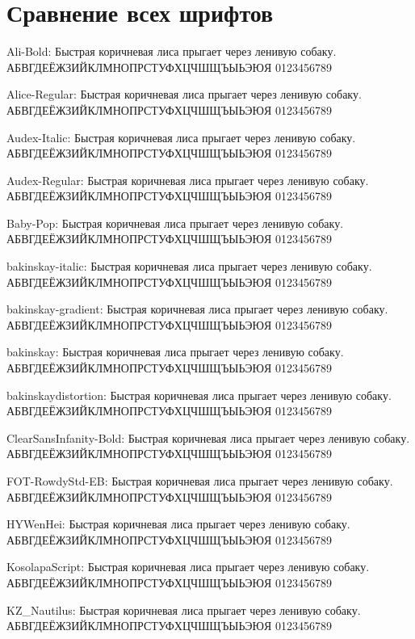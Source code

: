 \documentclass[12pt]{article}
\begin{document}
\section{Сравнение всех шрифтов}

{\alibold Ali-Bold: Быстрая коричневая лиса прыгает через ленивую собаку. АБВГДЕЁЖЗИЙКЛМНОПРСТУФХЦЧШЩЪЫЬЭЮЯ 0123456789}

{\aliceregular Alice-Regular: Быстрая коричневая лиса прыгает через ленивую собаку. АБВГДЕЁЖЗИЙКЛМНОПРСТУФХЦЧШЩЪЫЬЭЮЯ 0123456789}

{\audexitalic Audex-Italic: Быстрая коричневая лиса прыгает через ленивую собаку. АБВГДЕЁЖЗИЙКЛМНОПРСТУФХЦЧШЩЪЫЬЭЮЯ 0123456789}

{\audexregular Audex-Regular: Быстрая коричневая лиса прыгает через ленивую собаку. АБВГДЕЁЖЗИЙКЛМНОПРСТУФХЦЧШЩЪЫЬЭЮЯ 0123456789}

{\babypop Baby-Pop: Быстрая коричневая лиса прыгает через ленивую собаку. АБВГДЕЁЖЗИЙКЛМНОПРСТУФХЦЧШЩЪЫЬЭЮЯ 0123456789}

{\bakinskayitalic bakinskay-italic: Быстрая коричневая лиса прыгает через ленивую собаку. АБВГДЕЁЖЗИЙКЛМНОПРСТУФХЦЧШЩЪЫЬЭЮЯ 0123456789}

{\bakinskaygradient bakinskay-gradient: Быстрая коричневая лиса прыгает через ленивую собаку. АБВГДЕЁЖЗИЙКЛМНОПРСТУФХЦЧШЩЪЫЬЭЮЯ 0123456789}

{\bakinskay bakinskay: Быстрая коричневая лиса прыгает через ленивую собаку. АБВГДЕЁЖЗИЙКЛМНОПРСТУФХЦЧШЩЪЫЬЭЮЯ 0123456789}

{\bakinskaydistortion bakinskaydistortion: Быстрая коричневая лиса прыгает через ленивую собаку. АБВГДЕЁЖЗИЙКЛМНОПРСТУФХЦЧШЩЪЫЬЭЮЯ 0123456789}

{\clearsansinfanitybold ClearSansInfanity-Bold: Быстрая коричневая лиса прыгает через ленивую собаку. АБВГДЕЁЖЗИЙКЛМНОПРСТУФХЦЧШЩЪЫЬЭЮЯ 0123456789}

{\fotrowdystd FOT-RowdyStd-EB: Быстрая коричневая лиса прыгает через ленивую собаку. АБВГДЕЁЖЗИЙКЛМНОПРСТУФХЦЧШЩЪЫЬЭЮЯ 0123456789}

{\hywenhei HYWenHei: Быстрая коричневая лиса прыгает через ленивую собаку. АБВГДЕЁЖЗИЙКЛМНОПРСТУФХЦЧШЩЪЫЬЭЮЯ 0123456789}

{\kosolapascript KosolapaScript: Быстрая коричневая лиса прыгает через ленивую собаку. АБВГДЕЁЖЗИЙКЛМНОПРСТУФХЦЧШЩЪЫЬЭЮЯ 0123456789}

{\kznautilus KZ\_Nautilus: Быстрая коричневая лиса прыгает через ленивую собаку. АБВГДЕЁЖЗИЙКЛМНОПРСТУФХЦЧШЩЪЫЬЭЮЯ 0123456789}
\end{document}
